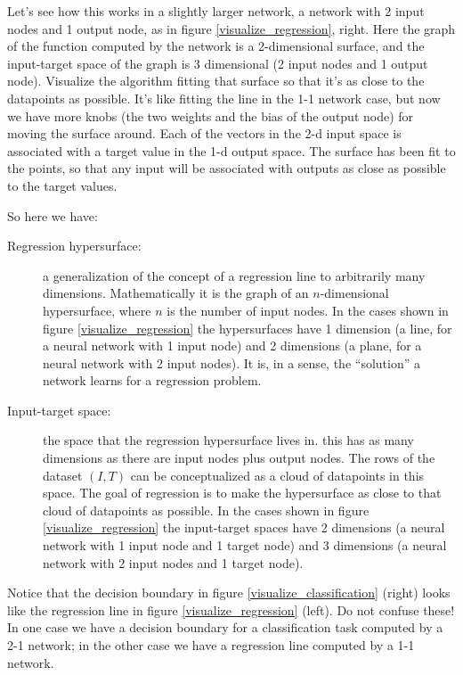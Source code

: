 Let's see how this works in a slightly larger network, a network with 2 input nodes and 1 output node, as in figure \ref{visualize_regression}, right. Here the graph of the function computed by the network is a 2-dimensional surface, and the input-target space of the graph is 3 dimensional (2 input nodes and 1 output node). Visualize the algorithm fitting that surface so that it's as close to the datapoints as possible. It's like fitting the line in the 1-1 network case, but now we have more knobs (the two weights and the bias of the output node) for moving the surface around. Each of the vectors in the 2-d input space is associated with a target value in the 1-d output space. The surface has been fit to the points, so that any input will be associated with outputs as close as possible to the target values. 

So here we have:
\begin{description}
\item[Regression hypersurface:] a generalization of the concept of a regression line to arbitrarily many dimensions. Mathematically it is the graph of an $n$-dimensional hypersurface, where $n$ is the number of input nodes. In the cases shown in figure \ref{visualize_regression} the hypersurfaces have 1 dimension (a line, for a neural network with 1 input node) and 2 dimensions (a plane, for a neural network with 2 input nodes). It is, in a sense, the ``solution'' a network learns for a regression problem. 
\item[Input-target space:] the space that the regression hypersurface lives in. this has as many dimensions as there are input nodes plus output nodes. The rows of the dataset $(I,T)$ can be conceptualized as a cloud of datapoints in this space. The goal of regression is to make the hypersurface as close to that cloud of datapoints as possible. In the cases shown in figure \ref{visualize_regression} the input-target spaces have 2 dimensions (a neural network with 1 input node and 1 target node) and 3 dimensions (a neural network with 2 input nodes and 1 target node).
\end{description}

Notice that the decision boundary in figure \ref{visualize_classification} (right) looks like the regression line in figure \ref{visualize_regression} (left). Do not confuse these! In one case we have a decision boundary for a classification task computed by a 2-1 network; in the other case we have a regression line computed by a 1-1  network.

